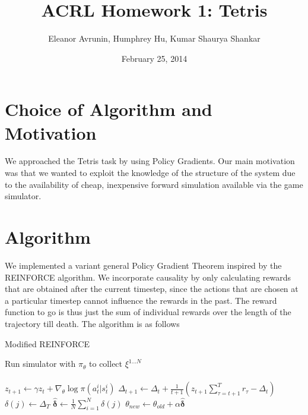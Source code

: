 \documentclass[11pt]{article}
\begin{document}
  

\title{ACRL Homework 1:  Tetris}
\date{February 25, 2014}
\author{Eleanor Avrunin, Humphrey Hu, Kumar Shaurya Shankar}

\maketitle

\section{Choice of Algorithm and Motivation}
We approached the Tetris task by using Policy Gradients. Our main motivation was that we wanted to exploit the knowledge of the structure of the system due to the availability of cheap, inexpensive forward simulation available via the game simulator. 


\section{Algorithm}
We implemented a variant general Policy Gradient Theorem inspired by the REINFORCE algorithm. We incorporate causality by only calculating rewards that are obtained after the current timestep, since the actions that are chosen at a particular timestep cannot influence the rewards in the past. The reward function to go is thus just the sum of individual rewards over the length of the trajectory till death. The algorithm is as follows

\begin{algorithm}
\caption{Modified REINFORCE}
\label{reinforce_alg}
\begin{algorithmic}
\STATE Run simulator with $\pi_{\theta}$ to collect $\xi^{1...N}$\\
\\
\STATE $z_{t+1} \gets \gamma z_t + \nabla_{\theta}\log\pi\left(a_{t}^{i}|s_{t}^{i} \right)$
\STATE $\Delta_{t+1} \gets \Delta_t + \frac{1}{t+1} \left( z_{t+1} \sum_{\tau = t+1}^{T}{r_\tau} - \Delta_t\right)$
\ENDFOR
\STATE $\delta(j) \gets \Delta_T$
\ENDFOR
\STATE $\hat{\mathbf{\delta}} \gets \frac{1}{N} \sum_{i=1}^{N} \delta(j)$
\STATE $\theta_{new} \gets  \theta_{old}+\alpha\hat{\mathbf{\delta}}$
\ENDFOR
\end{algorithmic}
\end{algorithm}
\end{document}

